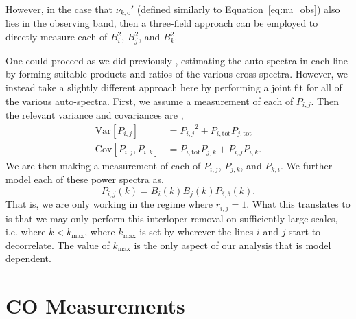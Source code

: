 \documentclass{aastex62}
\newcommand{\beq}{\begin{equation}}
\newcommand{\eeq}{\end{equation}}
\newcommand{\mynu}[2]{\ensuremath{\nu_{#1,\text{#2}}}}
\newcommand{\denps}{\ensuremath{P_{\delta,\delta}}}
\newcommand{\xps}[2]{\ensuremath{P_{#1,#2}}}
\newcommand{\pstot}[1]{\ensuremath{P_{#1,\text{tot}}}}
\newcommand{\Var}[1]{\mathrm{Var}[#1]}
\newcommand{\Cov}[2]{\mathrm{Cov}[#1,#2]}
\begin{document}
However, in the case that $\mynu{k}{o}'$ (defined similarly to
Equation~\ref{eq:nu_obs}) also lies in the observing band, then a three-field
approach can be employed to directly measure each of $B_i^2$, $B_j^2$, and
$B_k^2$.

One could proceed as we did previously \citep{2018arXiv181110609B}, estimating
the auto-spectra in each line by forming suitable products and ratios of the
various cross-spectra. However, we instead take a slightly different approach
here by performing a joint fit for all of the various auto-spectra. First, we
assume a measurement of each of $\xps{i}{j}$. Then the relevant variance and
covariances are \citep[e.g.][]{2015JCAP...03..034V},
\beq
\begin{split}
\Var{\xps{i}{j}} &= \xps{i}{j}^2 + \pstot{i}\pstot{j} \\
\Cov{\xps{i}{j}}{\xps{i}{k}} &= \pstot{i}\xps{j}{k} +
\xps{i}{j}\xps{i}{k}\text{.}
\end{split}
\eeq
We are then making a measurement of each of $\xps{i}{j}$, $\xps{j}{k}$,
and $\xps{k}{i}$. We further model each of these power spectra as,
\beq
\xps{i}{j}(k) = B_i(k) B_j(k) \denps(k)\text{.}
\eeq
That is, we are only working in the regime where $r_{i,j}=1$. What this
translates to is that we may only perform this interloper removal on
sufficiently large scales, i.e. where $k<k_{\text{max}}$, where
$k_{\text{max}}$ is set by wherever the lines $i$ and $j$ start to
decorrelate. The value of $k_{\text{max}}$ is the only aspect of our analysis
that is model dependent.

\section{CO Measurements} \label{sec:co_measurements}
\end{document}
